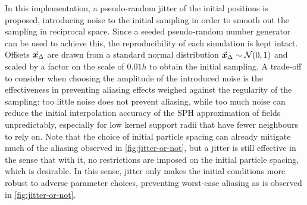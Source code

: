 In this implementation, a pseudo-random jitter of the initial positions is proposed, introducing noise to the initial sampling in order to smooth out the sampling in reciprocal space. Since a seeded pseudo-random number generator can be used to achieve this, the reproducibility of each simulation is kept intact. Offsets $\vec{\bm{x}}_{\Delta}$ are drawn from a standard normal distribution $\vec{\bm{x}}_{\Delta} \sim \mathcal{N}(0, 1)$ and scaled by a factor on the scale of $0.01h$ to obtain the initial sampling. A trade-off to consider when choosing the amplitude of the introduced noise is the effectiveness in preventing aliasing effects weighed against the regularity of the sampling: too little noise does not prevent aliasing, while too much noise can reduce the initial interpolation accuracy of the SPH approximation of fields unpredictably, especially for low kernel support radii that have fewer neighbours to rely on. Note that the choice of initial particle spacing can already mitigate much of the aliasing observed in \autoref{fig:jitter-or-not}, but a jitter is still effective in the sense that with it, no restrictions are imposed on the initial particle spacing, which is desirable. In this sense, jitter only makes the initial conditions more robust to adverse parameter choices, preventing worst-case aliasing as is observed in \autoref{fig:jitter-or-not}.

